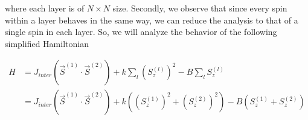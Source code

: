 \documentclass{article}
\begin{document}
where each layer is of $N \times N$ size. Secondly, we observe that since every spin within a layer
behaves in the same way, we can reduce the analysis to that of a single spin in each layer. So, we will
analyze the behavior of the following simplified Hamiltonian

$$
\begin{aligned}
   H &= J_{inter}(\vec{S}^{(1)} \cdot \vec{S}^{(2)}) + k\sum_{l}\left (S_{z}^{(l)}\right )^{2} - B \sum_{l}S_{z}^{(l)} \\
     &= J_{inter}(\vec{S}^{(1)} \cdot \vec{S}^{(2)}) + k( (S_{z}^{(1)} )^{2} + (S_{z}^{(2)} )^{2}) - B(S_{z}^{(1)} + S_{z}^{(2)})
\end{aligned}
$$
\end{document}
